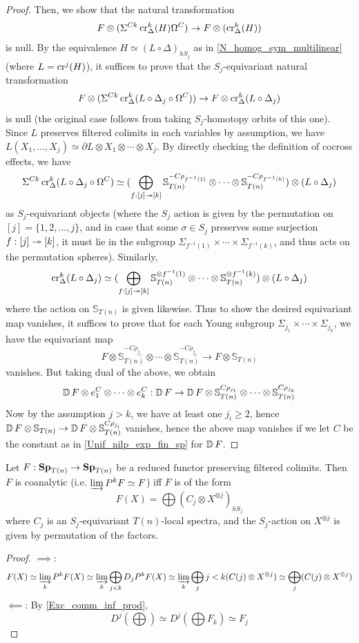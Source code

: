 \begin{proof}
		Then, we show that the natural transformation 
		\[ F\otimes(\Sigma^{Ck}\operatorname{\mathrm{cr}}^k_\Delta(H)\Omega^C)\to F\otimes(\operatorname{\mathrm{cr}}^k_\Delta(H)) \]
		is null. By the equivalence $H\simeq(L\circ\Delta)_{hS_j}$ as in \cref{N_homog_sym_multilinear} (where $L=\operatorname{\mathrm{cr}}^j(H)$), it suffices to prove that the $S_j$-equivariant natural transformation 
		\[ F\otimes(\Sigma^{Ck}\operatorname{\mathrm{cr}}^k_\Delta(L\circ\Delta_j\circ\Omega^C))\to F\otimes\operatorname{\mathrm{cr}}^k_\Delta(L\circ\Delta_j) \]
		is null (the original case follows from taking $S_j$-homotopy orbits of this one). Since $L$ preserves filtered colimits in each variables by assumption, we have $L(X_1,\dots,X_j)\simeq\partial L\otimes X_1\otimes\cdots\otimes X_j$. By directly checking the definition of cocross effects, we have 
		\[ \Sigma^{Ck}\operatorname{\mathrm{cr}}^k_\Delta(L\circ\Delta_j\circ\Omega^C)\simeq(\bigoplus_{f:[j]\twoheadrightarrow[k]}\mathbb{S}_{T(n)}^{-C\rho_{f^{-1}(1)}}\otimes\cdots\otimes\mathbb{S}_{T(n)}^{-C\rho_{f^{-1}(k)}})\otimes(L\circ\Delta_j) \]
		as $S_j$-equivariant objects (where the $S_j$ action is given by the permutation on $[j]=\{1,2,\dots,j\}$, and in case that some $\sigma\in S_j$ preserves some surjection $f:[j]\twoheadrightarrow[k]$, it must lie in the subgroup $\Sigma_{f^{-1}(1)}\times\cdots\times\Sigma_{f^{-1}(k)}$, and thus acts on the permutation spheres). Similarly, 
		\[ \operatorname{\mathrm{cr}}^k_\Delta(L\circ\Delta_j)\simeq(\bigoplus_{f:[j]\twoheadrightarrow[k]}\mathbb{S}_{T(n)}^{\otimes f^{-1}(1)}\otimes\cdots\otimes\mathbb{S}_{T(n)}^{\otimes f^{-1}(k)})\otimes(L\circ\Delta_j) \]
		where the action on $\mathbb{S}_{T(n)}$ is given likewise. Thus to show the desired equivariant map vanishes, it suffices to prove that for each Young subgroup $\Sigma_{j_1}\times\cdots\times\Sigma_{j_k}$, we have the equivariant map 
		\[ F\otimes\mathbb{S}_{T(n)}^{-C\rho_{j_1}}\otimes\cdots\otimes\mathbb{S}_{T(n)}^{-C\rho_{j_k}}\to F\otimes\mathbb{S}_{T(n)} \]
		vanishes. But taking dual of the above, we obtain 
		\[ \operatorname{\mathbb{D}} F\otimes e_1^C\otimes\cdots\otimes e_k^C:\operatorname{\mathbb{D}} F\to \operatorname{\mathbb{D}} F\otimes\mathbb{S}_{T(n)}^{C\rho_{j_1}}\otimes\cdots\otimes\mathbb{S}_{T(n)}^{C\rho_{j_k}} \]
		Now by the assumption $j>k$, we have at least one $j_i\geq2$, hence $\operatorname{\mathbb{D}} F\otimes\mathbb{S}_{T(n)}\to \operatorname{\mathbb{D}} F\otimes\mathbb{S}_{T(n)}^{C\rho_{j_i}}$ vanishes, hence the above map vanishes if we let $C$ be the constant as in \cref{Unif_nilp_exp_fin_sp} for $\operatorname{\mathbb{D}} F$.
	\end{proof}

	\begin{coro}\label{Coanalytic_fun_classification}
		Let $F:\mathbf{Sp}_{T(n)}\to\mathbf{Sp}_{T(n)}$ be a reduced functor preserving filtered colimits. Then $F$ is coanalytic (i.e. $\varinjlim P^kF\simeq F$) iff $F$ is of the form 
		\[ F(X)=\bigoplus(C_j\otimes X^{\otimes j})_{hS_j} \]
		where $C_j$ is an $S_j$-equivariant $T(n)$-local spectra, and the $S_j$-action on $X^{\otimes j}$ is given by permutation of the factors. 
	\end{coro}
	\begin{proof}
		$\implies$: 
		\[ F(X)\simeq\varinjlim_kP^kF(X)\simeq\varinjlim_k\bigoplus_{j<k}D_jP^kF(X)\simeq\varinjlim_k\bigoplus_j{j<k}(C(j)\otimes X^{\otimes j})\simeq\bigoplus_j(C(j)\otimes X^{\otimes j}) \]
		$\impliedby$: By \cref{Exc_comm_inf_prod}, 
		\[ D^j(\bigoplus)\simeq D^j(\bigoplus F_k)\simeq F_j \]
	\end{proof}
	
